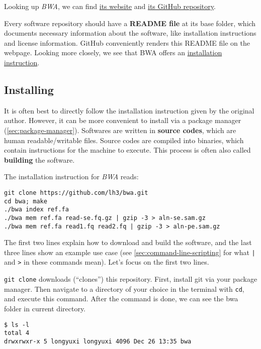 \documentclass[12pt,letterpaper]{article}
\begin{document}
Looking up \textit{BWA}, we can find \href{https://bio-bwa.sourceforge.net/}{its website} and \href{https://github.com/lh3/bwa}{its GitHub repository}.

Every software repository should have a \textbf{README file} at its base folder, which documents necessary information about the software, like installation instructions and license information. GitHub conveniently renders this README file on the webpage. Looking more closely, we see that BWA offers an \href{https://github.com/lh3/bwa}{installation instruction}.


\subsection{Installing}

It is often best to directly follow the installation instruction given by the original author. However, it can be more convenient to install via a package manager (\cref*{sec:package-manager}). Softwares are written in \textbf{source codes}, which are human readable/writable files. Source codes are compiled into binaries, which contain instructions for the machine to execute. This process is often also called \textbf{building} the software.

The installation instruction for \textit{BWA} reads:

\begin{verbatim}
git clone https://github.com/lh3/bwa.git
cd bwa; make
./bwa index ref.fa
./bwa mem ref.fa read-se.fq.gz | gzip -3 > aln-se.sam.gz
./bwa mem ref.fa read1.fq read2.fq | gzip -3 > aln-pe.sam.gz
\end{verbatim}

The first two lines explain how to download and build the software, and the last three lines show an example use case (see \cref*{sec:command-line-scripting} for what \texttt{|} and \texttt{>} in these commands mean). Let's focus on the first two lines.

\texttt{git clone} downloads (``clones'') this repository. First, install git via your package manager. Then navigate to a directory of your choice in the terminal with \texttt{cd}, and execute this command. After the command is done, we can see the bwa folder in current directory.

\begin{verbatim}
$ ls -l
total 4
drwxrwxr-x 5 longyuxi longyuxi 4096 Dec 26 13:35 bwa
\end{verbatim}
\end{document}
